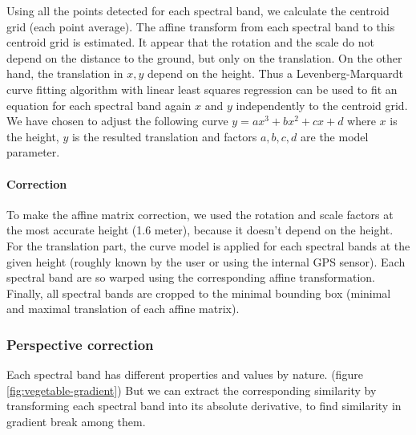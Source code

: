 \documentclass[]{elsarticle}
\begin{document}
	Using all the points detected for each spectral band, we calculate the centroid grid (each point average).
	The affine transform from each spectral band to this centroid grid is estimated.
	It appear that the rotation and the scale do not depend on the distance to the ground, but only on the translation.
	On the other hand, the translation in $x, y$ depend on the height.
	Thus a Levenberg-Marquardt curve fitting algorithm with linear least squares regression \cite{More78}
	can be used to fit an equation for each spectral band again $x$ and $y$ independently to the centroid grid.
	We have chosen to adjust the following curve $y = ax^3 + bx^2 + cx + d$ where $x$ is the height,
	$y$ is the resulted translation and factors $a,b,c,d$ are the model parameter.
	
	\paragraph{Correction}
	
	To make the affine matrix correction, we used the rotation and scale factors at the most accurate height (1.6 meter), because it doesn't depend on the height.
	For the translation part, the curve model is applied for each spectral bands at the given height (roughly known by the user or using the internal GPS sensor).
	Each spectral band are so warped using the corresponding affine transformation.
	Finally, all spectral bands are cropped to the minimal bounding box (minimal and maximal translation of each affine matrix).
	
	\newpage
	\subsubsection{Perspective correction}
	
	
	Each spectral band has different properties and values by nature. (figure \ref{fig:vegetable-gradient})
	But we can extract the corresponding similarity by transforming each spectral band into its absolute derivative,
	to find similarity in gradient break among them.
	
\end{document}
